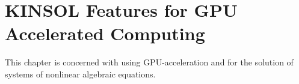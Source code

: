 \chapter{KINSOL Features for GPU Accelerated Computing}\label{s:kingpu}

This chapter is concerned with using GPU-acceleration and {\kinsol} for the solution
of systems of nonlinear algebraic equations.


